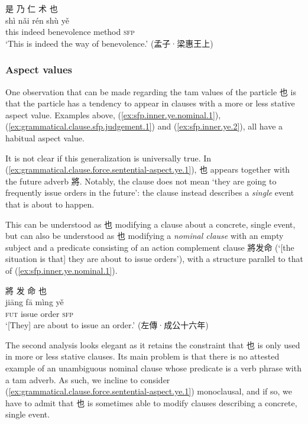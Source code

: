 \documentclass[UTF8, a4paper, oneside, scheme=plain, 12pt]{ctexrep}
\newcommand{\translate}[1]{`#1'}
\newcommand*{\category}[1]{\textsc{#1}}
\begin{document}
\begin{exe}
    \ex\label{ex:sfp.inner.ye.2}
    \glll 是 乃 仁 术 也 \\
    shì nǎi rén shù yě \\
    this indeed benevolence method \category{sfp} \\
    \glt\translate{This is indeed the way of benevolence.} \hfill (孟子·梁惠王上)
\end{exe}

\subsubsection{Aspect values}

One observation that can be made regarding the \ac{tam} values of the particle 也 is that the particle has a tendency to appear in clauses with a more or less stative aspect value.
Examples above, (\ref{ex:sfp.inner.ye.nominal.1}), (\ref{ex:grammatical.clause.sfp.judgement.1}) and (\ref{ex:sfp.inner.ye.2}), all have a habitual aspect value.

It is not clear if this generalization is universally true.
In (\ref{ex:grammatical.clause.force.sentential-aspect.ye.1}),
也 appears together with the future adverb 將.
Notably, the clause does not mean \translate{they are going to frequently issue orders in the future}:
the clause instead describes a \emph{single} event that is about to happen.

This can be understood as 也 modifying a clause about a concrete, single event,
but can also be understood as 也 modifying a \emph{nominal clause} 
with an empty subject and a predicate consisting of an action complement clause 將发命
(\translate{[the situation is that] they are about to issue orders}),
with a structure parallel to that of (\ref{ex:sfp.inner.ye.nominal.1}).

\begin{exe}
    \ex\label{ex:grammatical.clause.force.sentential-aspect.ye.1}
    \glll 將 发 命 也 \\
    jiāng fā mìng yě \\
    \category{fut} issue order \category{sfp} \\
    \glt\translate{[They] are about to issue an order.} \hfill (左傳·成公十六年)
\end{exe}

The second analysis looks elegant as it retains the constraint that 也 is only used in more or less stative clauses.
Its main problem is that there is no attested example of an unambiguous nominal clause whose predicate is a verb phrase with a \ac{tam} adverb.
As such, we incline to consider (\ref{ex:grammatical.clause.force.sentential-aspect.ye.1}) monoclausal, and if so, we have to admit that 也 is sometimes able to modify clauses describing a concrete, single event.
\end{document}
